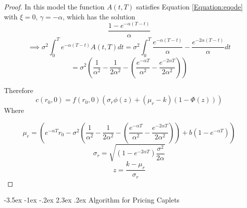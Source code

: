 \documentclass[12pt]{article}
\makeatletter
\renewcommand\section{\@startsection{section}{1}{\z@}%
                                  {-3.5ex \@plus -1ex \@minus -.2ex}%
                                  {2.3ex \@plus.2ex}%
                                  {\normalfont\large\bfseries}}
\theoremstyle{definition}
\theoremstyle{remark}
\makeatother
\begin{document}
\begin{proof}
In this model the function \(A(t, T)\) satisfies Equation \ref{Equation:eqode} with \( \xi=0\), \(\gamma=-\alpha \), which has the solution 
\[\frac{1-e^{-\alpha (T-t)}}{\alpha}\]
\[\implies \sigma^2 \int _0^T e^{-\alpha (T-t)}A(t, T) dt=\sigma^2 \int _0^T \frac{e^{-\alpha(T-t)}}{\alpha} -\frac{e^{-2\alpha(T-t)}}{\alpha} dt \]
\[=\sigma^2\left(\frac{1}{\alpha^2}-\frac{1}{2\alpha^2}-\left(\frac{e^{-\alpha T}}{\alpha^2}-\frac{e^{-2\alpha T}}{2\alpha^2} \right)\right)   \]

Therefore 
\[c(r_0, 0)=f(r_0, 0)\left( \sigma_r \phi(z)+  (\mu_r-k)(1-\Phi(z))  \right)\] 
Where

\[\mu _r = \left(e^{-\alpha T} r_0-\sigma^2\left(\frac{1}{\alpha^2}-\frac{1}{2\alpha^2}-\left(\frac{e^{-\alpha T}}{\alpha^2}-\frac{e^{-2\alpha T}}{2\alpha^2} \right)\right)+ b \left(1-e^{-\alpha T} \right) \right)\]
\[\sigma_r= \sqrt{\left(1 -e^{-2\alpha T}\right)\frac{\sigma^2}{2\alpha}}\]
\[z=\frac{k-\mu_r}{\sigma_r}\]




\end{proof}

\section{Algorithm for Pricing Caplets}
\end{document}
